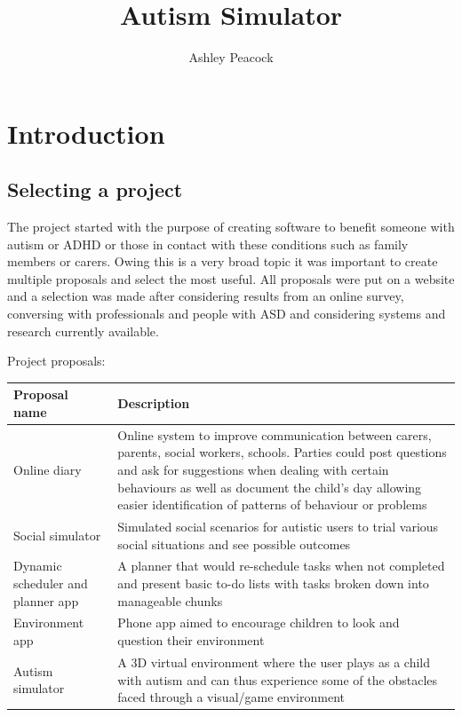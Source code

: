 \documentclass[11pt]{report}
\begin{document}
\title{Autism Simulator}
\author{Ashley Peacock}
\maketitle
\tableofcontents
\chapter{Introduction}

\section{Selecting a project}
The project started with the purpose of creating software to benefit someone with autism or ADHD or those in contact with these conditions such as family members or carers. Owing this is a very broad topic it was important to create multiple proposals and select the most useful. All proposals were put on a website and a selection was made after considering results from an online survey, conversing with professionals and people with ASD and considering systems and research currently available.

Project proposals:
\begin{table}[H]
    \begin{tabular}{| p{4cm} | p{9cm} |}
    \hline
    Proposal name & Description                                                                  \\
    \hline
    \hline
    Online diary & Online system to improve communication between carers, parents, social workers, schools. Parties could post questions and ask for suggestions when dealing with certain behaviours as well as document the child's day allowing easier identification of patterns of behaviour or problems                    \\
    \hline
    Social simulator & Simulated social scenarios for autistic users to trial various social situations and see possible outcomes  \\
    \hline
    Dynamic scheduler and planner app & A planner that would re-schedule tasks when not completed and present basic to-do lists with tasks broken down into manageable chunks  \\
    \hline
    Environment app & Phone app aimed to encourage children to look and question their environment \\
    \hline
   Autism simulator & A 3D virtual environment where the user plays as a child with autism and can thus experience some of the obstacles faced through a visual/game environment \\
    \hline
    \end{tabular}
\end{table}
\end{document}
